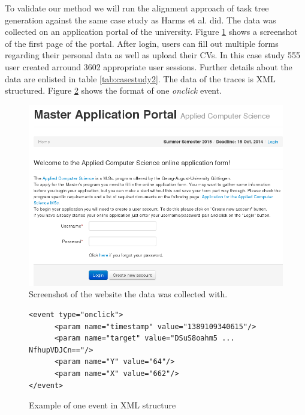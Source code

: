 To validate our method we will run the alignment approach of task tree generation against the same case study as Harms et al. did.
The data was collected on an application portal of the university. 
Figure \ref{fig:screenshotmasterportal} shows a screenshot of the first page of the portal.
After login, users can fill out multiple forms regarding their personal data as well as upload their CVs. 
In this case study 555 user created arround 3602 appropriate user sessions. 
Further details about the data are enlisted in table \ref{tab:casestudy2}.
The data of the traces is XML structured. Figure \ref{fig:xml} shows the format of one \textit{onclick} event.

\begin{figure}
	\includegraphics[width=\textwidth]{chapters/casestudy/masterportalscreenshot.png}
	\caption{Screenshot of the website the data was collected with.}
	\label{fig:screenshotmasterportal}
\end{figure}
\begin{figure}
\begin{verbatim}
<event type="onclick">
      <param name="timestamp" value="1389109340615"/>
      <param name="target" value="DSuS8oahm5 ... NfhupVDJCn=="/>
      <param name="Y" value="64"/>
      <param name="X" value="662"/>
</event>
\end{verbatim}
\caption{Example of one event in XML structure} 
\label{fig:xml}
\end{figure}



